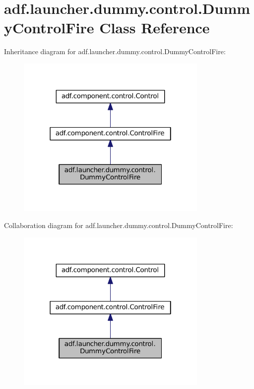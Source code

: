 \hypertarget{classadf_1_1launcher_1_1dummy_1_1control_1_1DummyControlFire}{}\section{adf.\+launcher.\+dummy.\+control.\+Dummy\+Control\+Fire Class Reference}
\label{classadf_1_1launcher_1_1dummy_1_1control_1_1DummyControlFire}


Inheritance diagram for adf.\+launcher.\+dummy.\+control.\+Dummy\+Control\+Fire\+:
\nopagebreak
\begin{figure}[H]
\begin{center}
\leavevmode
\includegraphics[width=262pt]{classadf_1_1launcher_1_1dummy_1_1control_1_1DummyControlFire__inherit__graph}
\end{center}
\end{figure}


Collaboration diagram for adf.\+launcher.\+dummy.\+control.\+Dummy\+Control\+Fire\+:
\nopagebreak
\begin{figure}[H]
\begin{center}
\leavevmode
\includegraphics[width=262pt]{classadf_1_1launcher_1_1dummy_1_1control_1_1DummyControlFire__coll__graph}
\end{center}
\end{figure}
